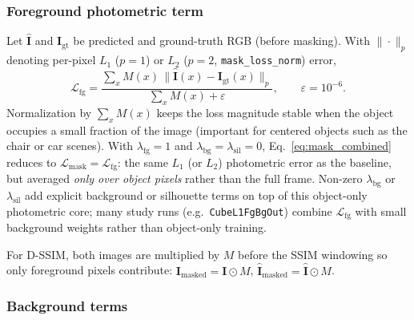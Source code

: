 \documentclass{report}
\begin{document}
\subsubsection{Foreground photometric term}
\label{subsubsec:mask_fg}

Let $\hat{\mathbf{I}}$ and $\mathbf{I}_{\mathrm{gt}}$ be predicted and ground-truth RGB (before masking). With $\|\cdot\|_{p}$ denoting per-pixel $L_1$ ($p=1$) or $L_2$ ($p=2$, \texttt{mask\_loss\_norm}) error,
\begin{equation}
\mathcal{L}_{\mathrm{fg}}
=\frac{\sum_{x} M(x)\,\bigl\|\hat{\mathbf{I}}(x)-\mathbf{I}_{\mathrm{gt}}(x)\bigr\|_{p}}
{\sum_{x} M(x) + \varepsilon},
\qquad \varepsilon=10^{-6}.
\label{eq:mask_fg}
\end{equation}
Normalization by $\sum_x M(x)$ keeps the loss magnitude stable when the object occupies a small fraction of the image (important for centered objects such as the chair or car scenes). With $\lambda_{\mathrm{fg}}=1$ and $\lambda_{\mathrm{bg}}=\lambda_{\mathrm{sil}}=0$, Eq.~\eqref{eq:mask_combined} reduces to $\mathcal{L}_{\mathrm{mask}}=\mathcal{L}_{\mathrm{fg}}$: the same $L_1$ (or $L_2$) photometric error as the baseline, but averaged \emph{only over object pixels} rather than the full frame. Non-zero $\lambda_{\mathrm{bg}}$ or $\lambda_{\mathrm{sil}}$ add explicit background or silhouette terms on top of this object-only photometric core; many study runs (e.g.\ \texttt{CubeL1FgBgOut}) combine $\mathcal{L}_{\mathrm{fg}}$ with small background weights rather than object-only training.

For D-SSIM, both images are multiplied by $M$ before the SSIM windowing so only foreground pixels contribute:
$\mathbf{I}_{\mathrm{masked}}=\mathbf{I}\odot M$, $\hat{\mathbf{I}}_{\mathrm{masked}}=\hat{\mathbf{I}}\odot M$.

\subsubsection{Background terms}
\label{subsubsec:mask_bg}
\end{document}
